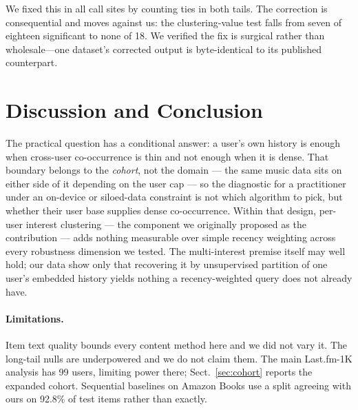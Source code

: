 \documentclass[runningheads]{llncs}
\begin{document}
We fixed this in all call sites by counting ties in both tails. The correction is
consequential and moves against us: the clustering-value test falls from seven of eighteen
significant to none of 18. We verified the fix is surgical rather than
wholesale---one dataset's corrected output is byte-identical to its published counterpart.

\section{Discussion and Conclusion}

The practical question has a conditional answer: a user's own history is enough when
cross-user co-occurrence is thin and not enough when it is dense. That boundary belongs to
the \emph{cohort}, not the domain --- the same music data sits on either side of it
depending on the user cap --- so the diagnostic for a practitioner under an on-device or
siloed-data constraint is not which algorithm to pick, but whether their user base supplies
dense co-occurrence. Within that design, per-user interest clustering --- the component we
originally proposed as the contribution --- adds nothing measurable over simple recency
weighting across every robustness dimension we tested. The multi-interest premise itself may
well hold; our data show only that recovering it by unsupervised partition of one user's
embedded history yields nothing a recency-weighted query does not already have.

\paragraph{Limitations.} Item text quality bounds every content method here and we did not
vary it. The long-tail nulls are underpowered and we do not claim them. The main Last.fm-1K
analysis has 99 users, limiting power there; Sect.~\ref{sec:cohort} reports the expanded
cohort. Sequential baselines on Amazon Books use a split agreeing with ours on 92.8\% of
test items rather than exactly.
\end{document}
